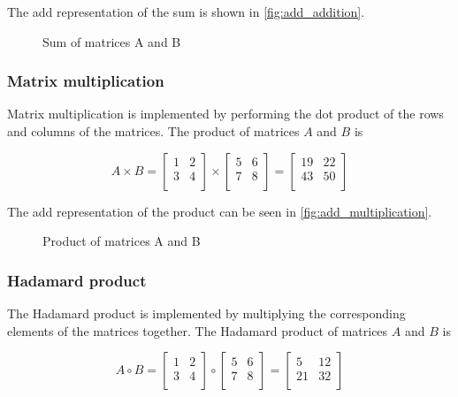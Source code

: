 The \gls{add} representation of the sum is shown in \autoref{fig:add_addition}.
\begin{figure}
    \centering
    
    \caption{Sum of matrices A and B}
    \label{fig:add_addition}
\end{figure}

\subsubsection{Matrix multiplication}
Matrix multiplication is implemented by performing the dot product of the rows and columns of the matrices.
The product of matrices $A$ and $B$ is

\[
    A \times B = \begin{bmatrix}
                     1 & 2 \\
                     3 & 4 \\
    \end{bmatrix} \times \begin{bmatrix}
                             5 & 6 \\
                             7 & 8 \\
    \end{bmatrix} = \begin{bmatrix}
                        19 & 22 \\
                        43 & 50 \\
    \end{bmatrix}
\]

The \gls{add} representation of the product can be seen in \autoref{fig:add_multiplication}.
\begin{figure}
    \centering
    
    \caption{Product of matrices A and B}
    \label{fig:add_multiplication}
\end{figure}

\subsubsection{Hadamard product}
The Hadamard product is implemented by multiplying the corresponding elements of the matrices together.
The Hadamard product of matrices $A$ and $B$ is

\[
    A \circ B = \begin{bmatrix}
                    1 & 2 \\
                    3 & 4 \\
    \end{bmatrix} \circ \begin{bmatrix}
                            5 & 6 \\
                            7 & 8 \\
    \end{bmatrix} = \begin{bmatrix}
                        5  & 12 \\
                        21 & 32 \\
    \end{bmatrix}
\]

